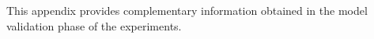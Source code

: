 This appendix provides complementary information obtained in the model validation phase of the
experiments.